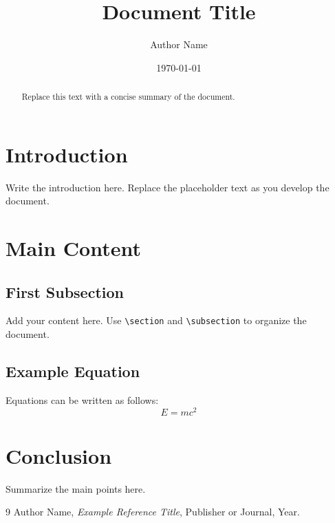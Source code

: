 \documentclass[12pt,a4paper]{article}
\title{Document Title}
\author{Author Name}
\date{\today}
\begin{document}
\maketitle

\begin{abstract}
Replace this text with a concise summary of the document.
\end{abstract}

\tableofcontents
\newpage

\section{Introduction}
Write the introduction here. Replace the placeholder text as you develop the
document.

\section{Main Content}
\subsection{First Subsection}
Add your content here. Use \verb|\section| and \verb|\subsection| to organize
the document.

\subsection{Example Equation}
Equations can be written as follows:
\begin{equation}
    E = mc^2
\end{equation}

\section{Conclusion}
Summarize the main points here.

\begin{thebibliography}{9}
Author Name,
\textit{Example Reference Title},
Publisher or Journal, Year.
\end{thebibliography}
\end{document}
